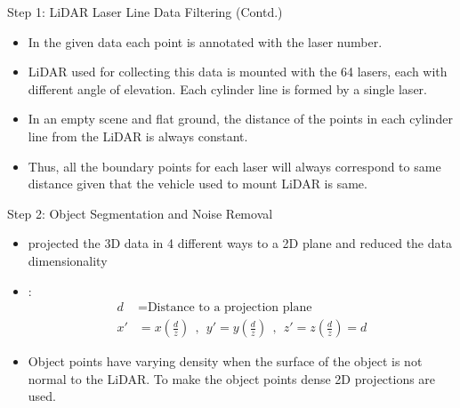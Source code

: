 \documentclass[9pt]{beamer}
\begin{document}
\begin{frame}[fragile]{Step 1: LiDAR Laser Line Data Filtering (Contd.)}
	\begin{itemize}
		\item In the given data each point is annotated with the laser number.
		\item LiDAR used for collecting this data is mounted with the 64 lasers, each with different angle of elevation. Each cylinder line is formed by a single laser.
		\item In an empty scene and flat ground, the distance of the points in each cylinder line from the LiDAR is always constant.
		\item Thus, all the boundary points for each laser will always correspond to same distance given that the vehicle used to mount LiDAR is same.
	\end{itemize}
\end{frame}


\begin{frame}[fragile]{Step 2: Object Segmentation and Noise Removal}
	\begin{itemize}
		\item {} projected the 3D data in 4 different ways to a 2D plane and reduced the data dimensionality

		\item {}:
		\begin{align*}
		d  & = \text{Distance to a projection plane} \\
		x' & =  x (\frac{d}{z}) \ \  , \ \  y' =  y (\frac{d}{z}) \ \  , \ \  z'=  z (\frac{d}{z}) = d
		\end{align*}

		\item Object points have varying density when the surface of the object is not normal to the LiDAR. To make the object points dense 2D projections are used.
	\end{itemize}
\end{frame}


\end{document}
